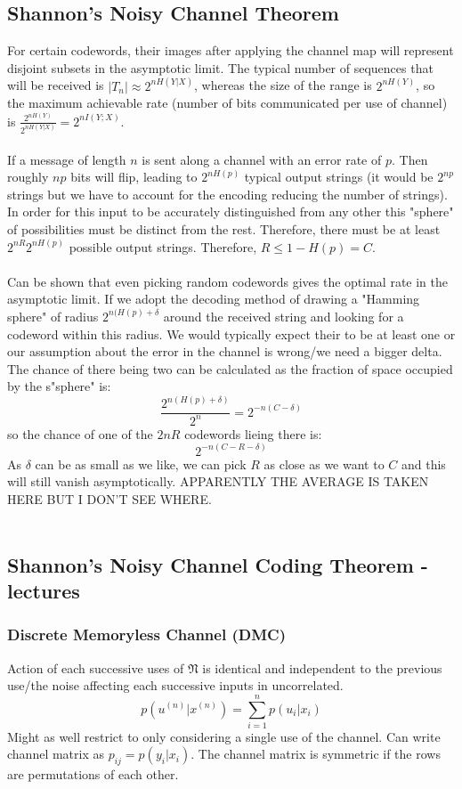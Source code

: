 \documentclass{article}
\begin{document}
\subsection{Shannon's Noisy Channel Theorem}
For certain codewords, their images after applying the channel map will represent disjoint subsets in the asymptotic limit. The typical number of sequences that will be received is $|T_n| \approx 2^{nH(Y|X)}$, whereas the size of the range is  $2^{nH(Y)}$, so the maximum achievable rate (number of bits communicated per use of channel) is $\frac{2^{nH(Y)}}{2^{nH(Y|X)}} = 2^{nI(Y;X)}$.\\\\
If a message of length $n$ is sent along a channel with an error rate of $p$. Then roughly $np$ bits will flip, leading to $2^{nH(p)}$ typical output strings (it would be $2^{np}$ strings but we have to account for the encoding reducing the number of strings). In order for this input to be accurately distinguished from any other this "sphere" of possibilities must be distinct from the rest. Therefore, there must be at least $2^{nR}2^{nH(p)}$ possible output strings. Therefore, $R \leq 1 - H(p) = C$.\\\\
Can be shown that even picking random codewords gives the optimal rate in the asymptotic limit. If we adopt the decoding method of drawing a "Hamming sphere" of radius $2^{n(H(p)+\delta}$ around the received string and looking for a codeword within this radius. We would typically expect their to be at least one or our assumption about the error in the channel is wrong/we need a bigger delta. The chance of there being two can be calculated as the fraction of space occupied by the s"sphere" is:
$$
\frac{2^{n(H(p)+\delta)}}{2^n} = 2^{-n(C-\delta)}
$$
so the chance of one of the $2{nR}$ codewords lieing there is:
$$
2^{-n(C-R-\delta)}
$$
As $\delta$ can be as small as we like, we can pick $R$ as close as we want to $C$ and this will still vanish asymptotically. APPARENTLY THE AVERAGE IS TAKEN HERE BUT I DON'T SEE WHERE.\\\\
\subsection{Shannon's Noisy Channel Coding Theorem - lectures}
\subsubsection{Discrete Memoryless Channel (DMC)}
Action of each successive uses of $\mathfrak{N}$ is identical and independent to the previous use/the noise affecting each successive inputs in uncorrelated. 
$$
p(u^{(n)}|x^{(n)}) = \sum_{i=1}^n p(u_i|x_i)
$$
Might as well restrict to only considering a single use of the channel. Can write channel matrix as $p_{ij} =p(y_i|x_i)$. The channel matrix is symmetric if the rows are permutations of each other.
\end{document}
